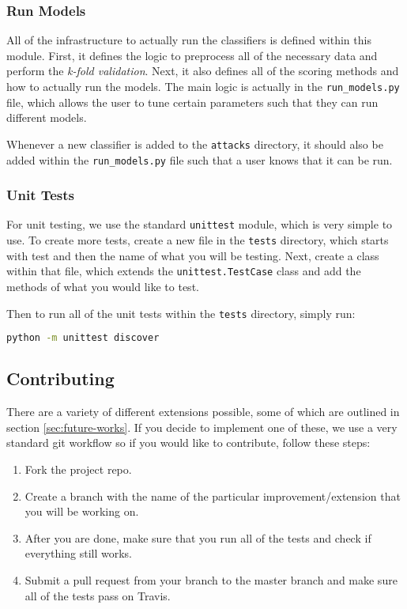 \newpage

\subsubsection{Run Models}

All of the infrastructure to actually run the classifiers is defined within this module.
First, it defines the logic to preprocess all of the necessary data and perform the \textit{k-fold validation}.
Next, it also defines all of the scoring methods and how to actually run the models.
The main logic is actually in the \texttt{run\_models.py} file, which allows the user to tune certain parameters such that they can run different models.

Whenever a new classifier is added to the \texttt{attacks} directory, it should also be added within the \texttt{run\_models.py} file such that a user knows that it can be run.

\subsubsection{Unit Tests}

For unit testing, we use the standard \texttt{unittest} module, which is very simple to use.
To create more tests, create a new file in the \texttt{tests} directory, which starts with test and then the name of what you will be testing.
Next, create a class within that file, which extends the \texttt{unittest.TestCase} class and add the methods of what you would like to test.

Then to run all of the unit tests within the \texttt{tests} directory, simply run:
\begin{lstlisting}[language=Bash]
python -m unittest discover
\end{lstlisting}

\subsection{Contributing}

There are a variety of different extensions possible, some of which are outlined in section \ref{sec:future-works}.
If you decide to implement one of these, we use a very standard git workflow so if you would like to contribute, follow these steps:

\begin{enumerate}
  \item Fork the project repo.
  \item Create a branch with the name of the particular improvement/extension that you will be working on.
  \item After you are done, make sure that you run all of the tests and check if everything still works.
  \item Submit a pull request from your branch to the master branch and make sure all of the tests pass on Travis.
\end{enumerate}

